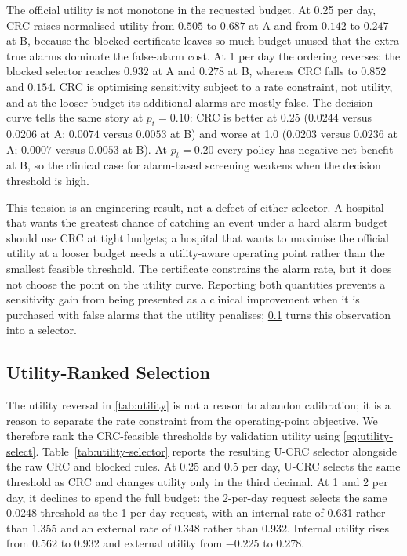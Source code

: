 The official utility is not monotone in the requested budget. At 0.25 per day, CRC raises normalised utility from $0.505$ to $0.687$ at A and from $0.142$ to $0.247$ at B, because the blocked certificate leaves so much budget unused that the extra true alarms dominate the false-alarm cost. At 1 per day the ordering reverses: the blocked selector reaches $0.932$ at A and $0.278$ at B, whereas CRC falls to $0.852$ and $0.154$. CRC is optimising sensitivity subject to a rate constraint, not utility, and at the looser budget its additional alarms are mostly false. The decision curve tells the same story at $p_t=0.10$: CRC is better at 0.25 ($0.0244$ versus $0.0206$ at A; $0.0074$ versus $0.0053$ at B) and worse at 1.0 ($0.0203$ versus $0.0236$ at A; $0.0007$ versus $0.0053$ at B). At $p_t=0.20$ every policy has negative net benefit at B, so the clinical case for alarm-based screening weakens when the decision threshold is high.

This tension is an engineering result, not a defect of either selector. A hospital that wants the greatest chance of catching an event under a hard alarm budget should use CRC at tight budgets; a hospital that wants to maximise the official utility at a looser budget needs a utility-aware operating point rather than the smallest feasible threshold. The certificate constrains the alarm rate, but it does not choose the point on the utility curve. Reporting both quantities prevents a sensitivity gain from being presented as a clinical improvement when it is purchased with false alarms that the utility penalises; \cref{sec:ucrc-results} turns this observation into a selector.

\FloatBarrier
\subsection{Utility-Ranked Selection}
\label{sec:ucrc-results}

The utility reversal in \cref{tab:utility} is not a reason to abandon calibration; it is a reason to separate the rate constraint from the operating-point objective. We therefore rank the CRC-feasible thresholds by validation utility using \cref{eq:utility-select}. Table~\ref{tab:utility-selector} reports the resulting U-CRC selector alongside the raw CRC and blocked rules. At 0.25 and 0.5 per day, U-CRC selects the same threshold as CRC and changes utility only in the third decimal. At 1 and 2 per day, it declines to spend the full budget: the 2-per-day request selects the same 0.0248 threshold as the 1-per-day request, with an internal rate of 0.631 rather than 1.355 and an external rate of 0.348 rather than 0.932. Internal utility rises from 0.562 to 0.932 and external utility from $-0.225$ to 0.278.

